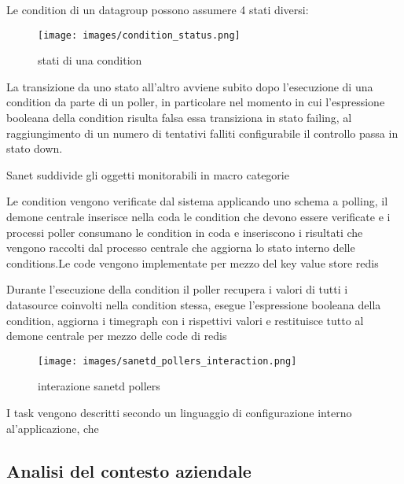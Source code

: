 \documentclass[12pt,a4paper,twoside,openright]{book}
\begin{document}
Le condition di un datagroup possono assumere 4 stati diversi:

\begin{figure}[H]
    \centering
    \texttt{[image: images/condition\_status.png]}
    \caption{stati di una condition}
    \label{fig:enter-label}
\end{figure}

La transizione da uno stato all'altro avviene subito dopo l'esecuzione di una condition da parte di un poller, in particolare nel momento in cui l'espressione booleana della condition risulta falsa essa transiziona in stato failing, al raggiungimento di un numero di tentativi falliti configurabile il controllo passa in stato down.

Sanet suddivide gli oggetti monitorabili in macro categorie

Le condition vengono verificate dal sistema applicando uno schema a polling, il demone centrale inserisce nella coda le condition che devono essere verificate e i processi poller consumano le condition in coda e inseriscono i risultati che vengono raccolti dal processo centrale che aggiorna lo stato interno delle conditions.Le code vengono implementate per mezzo del key value store redis

Durante l'esecuzione della condition il poller recupera i valori di tutti i datasource coinvolti nella condition stessa, esegue l'espressione booleana della condition, aggiorna i timegraph con i rispettivi valori e restituisce tutto al demone centrale per mezzo delle code di redis


\begin{figure}[H]
    \centering
    \texttt{[image: images/sanetd\_pollers\_interaction.png]}
    \caption{interazione sanetd pollers}
    \label{fig:enter-label}
\end{figure}


I task vengono descritti secondo un linguaggio di configurazione interno al'applicazione, che


\subsection{Analisi del contesto aziendale}
\end{document}
